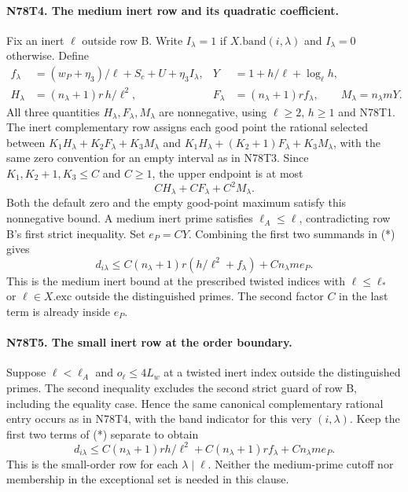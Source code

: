 \paragraph{N78T4. The medium inert row and its quadratic coefficient.}
Fix an inert $\ell$ outside row B. Write $I_\lambda=1$ if
$X.\mathrm{band}(i,\lambda)$ and $I_\lambda=0$ otherwise. Define
\[
 \begin{aligned}
 f_\lambda&=(w_P+\eta_3)/\ell+S_c+U+\eta_3 I_\lambda,
 &Y&=1+h/\ell+\log_\ell h,\\
 H_\lambda&=(n_\lambda+1)r\,h/\ell^2,
 &F_\lambda&=(n_\lambda+1)r f_\lambda,\qquad
 M_\lambda=n_\lambda mY .
 \end{aligned}
\]
All three quantities $H_\lambda,F_\lambda,M_\lambda$ are
nonnegative, using $\ell\ge2$, $h\ge1$ and N78T1. The inert
complementary row assigns each good point the rational selected
between $K_1H_\lambda+K_2F_\lambda+K_3M_\lambda$ and
$K_1H_\lambda+(K_2+1)F_\lambda+K_3M_\lambda$, with the same
zero convention for an empty interval as in N78T3. Since
$K_1,K_2+1,K_3\le C$ and $C\ge1$, the upper endpoint is at most
\[
          C H_\lambda+C F_\lambda+C^2 M_\lambda .                 \tag{*}
\]
Both the default zero and the empty good-point maximum satisfy this
nonnegative bound. A medium inert prime satisfies
$\ell_A\le\ell$, contradicting row B's first strict inequality.
Set $e_P=CY$. Combining the first two summands in (*) gives
\[
 d_{i\lambda}\le C(n_\lambda+1)r(h/\ell^2+f_\lambda)
                    +C n_\lambda m e_P .
\]
This is the medium inert bound at the prescribed twisted indices
with $\ell\le\ell_*$ or $\ell\in X.\mathrm{exc}$ outside the
distinguished primes. The second factor $C$ in the last term is
already inside $e_P$.

\paragraph{N78T5. The small inert row at the order boundary.}
Suppose $\ell<\ell_A$ and $o_\ell\le4L_w$ at a twisted inert index
outside the distinguished primes. The second inequality excludes the
second strict guard of row B, including the equality case. Hence the
same canonical complementary rational entry occurs as in N78T4, with
the band indicator for this very $(i,\lambda)$. Keep the first two
terms of (*) separate to obtain
\[
 d_{i\lambda}\le C(n_\lambda+1)r h/\ell^2+
                  C(n_\lambda+1)r f_\lambda+C n_\lambda m e_P .
\]
This is the small-order row for each $\lambda\mid\ell$. Neither the
medium-prime cutoff nor membership in the exceptional set is needed
in this clause.

